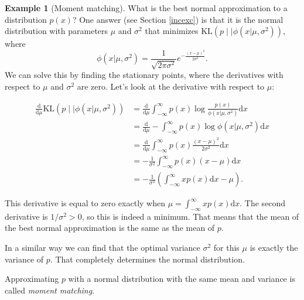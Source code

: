 \documentclass[12pt,vu]{adammath}
\newcommand\ddfrac[2]{\frac{\displaystyle #1}{\displaystyle #2}}
\newcommand\kl[2]{{\text{KL}({#1} \mid\mid {#2})}}
\theoremstyle{plain}
\theoremstyle{definition}
\newtheorem{example}[theorem]{Example}
\theoremstyle{remark}
\begin{document}
\begin{mybox}
\begin{example}[Moment matching]\label{momentmatching}
What is the best normal approximation to a distribution $p(x)$?
One answer (see Section \ref{incexc}) is that it is the normal distribution with parameters $\mu$ and $\sigma^2$ that minimizes $\kl{p}{\phi(x | \mu, \sigma^2)}$, where
$$\phi(x | \mu, \sigma^2) = \frac{1}{\sqrt{2\pi\sigma^2}}e^{-\ddfrac{(x-\mu)^2}{2\sigma^2}}.$$
We can solve this by finding the stationary points, where the derivatives with respect to $\mu$ and $\sigma^2$ are zero.
Let's look at the derivative with respect to $\mu$:

\begin{align*}
\frac{\mathrm{d}}{\mathrm{d} \mu} \kl{p}{\phi(x | \mu, \sigma^2)} &=
\frac{\mathrm{d}}{\mathrm{d} \mu} \int_{-\infty}^\infty p(x) \log \frac{p(x)}{\phi(x | \mu, \sigma^2)} \mathrm{d} x \\
&= \frac{\mathrm{d}}{\mathrm{d} \mu} - \int_{-\infty}^\infty p(x) \log \phi(x | \mu, \sigma^2) \mathrm{d} x \\
&= \frac{\mathrm{d}}{\mathrm{d} \mu} \int_{-\infty}^\infty p(x) \frac{(x - \mu)^2}{2 \sigma^2} \mathrm{d} x \\
&= -\frac{1}{\sigma^2} \int_{-\infty}^\infty p(x) (x - \mu) \mathrm{d} x \\
&= -\frac{1}{\sigma^2} \left( \int_{-\infty}^\infty x p(x) \mathrm{d} x - \mu \right).
\end{align*}

This derivative is equal to zero exactly when $\mu = \int_{-\infty}^\infty x p(x) \mathrm{d} x$.
The second derivative is $1 / \sigma^2 > 0$, so this is indeed a minimum.
That means that the mean of the best normal approximation is the same as the mean of $p$.

In a similar way we can find that the optimal variance $\sigma^2$ for this $\mu$ is exactly the variance of $p$.
That completely determines the normal distribution.

Approximating $p$ with a normal distribution with the same mean and variance is called \emph{moment matching}.
\end{example}
\end{mybox}
\end{document}
